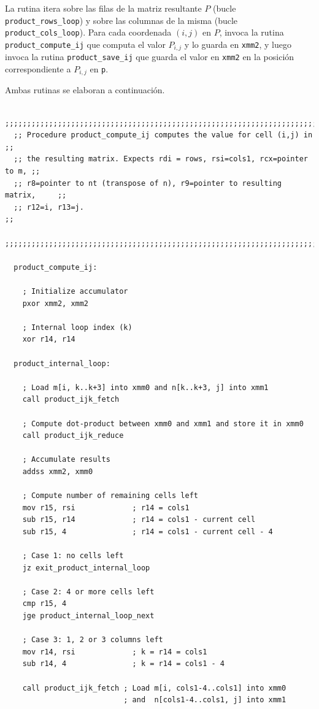 \documentclass[a4paper, 10pt, twoside]{article}
\newcommand{\cc}[1]{\texttt{#1}}
\begin{document}
La rutina itera sobre las filas de la matriz resultante $P$ (bucle
\cc{product\_rows\_loop}) y sobre las columnas de la misma (bucle
\cc{product\_cols\_loop}). Para cada coordenada $(i,j)$ en $P$, invoca la
rutina \cc{product\_compute\_ij} que computa el valor $P_{i,j}$ y lo guarda en
\cc{xmm2}, y luego invoca la rutina \cc{product\_save\_ij} que guarda el valor
en \cc{xmm2} en la posición correspondiente a $P_{i,j}$ en \cc{p}.

Ambas rutinas se elaboran a continuación.

\begin{verbatim}
  ;;;;;;;;;;;;;;;;;;;;;;;;;;;;;;;;;;;;;;;;;;;;;;;;;;;;;;;;;;;;;;;;;;;;;;;;;;;;
  ;; Procedure product_compute_ij computes the value for cell (i,j) in      ;;
  ;; the resulting matrix. Expects rdi = rows, rsi=cols1, rcx=pointer to m, ;;
  ;; r8=pointer to nt (transpose of n), r9=pointer to resulting matrix,     ;;
  ;; r12=i, r13=j.                                                          ;;
  ;;;;;;;;;;;;;;;;;;;;;;;;;;;;;;;;;;;;;;;;;;;;;;;;;;;;;;;;;;;;;;;;;;;;;;;;;;;;

  product_compute_ij:

    ; Initialize accumulator
    pxor xmm2, xmm2

    ; Internal loop index (k)
    xor r14, r14

  product_internal_loop:

    ; Load m[i, k..k+3] into xmm0 and n[k..k+3, j] into xmm1
    call product_ijk_fetch

    ; Compute dot-product between xmm0 and xmm1 and store it in xmm0
    call product_ijk_reduce

    ; Accumulate results
    addss xmm2, xmm0

    ; Compute number of remaining cells left
    mov r15, rsi             ; r14 = cols1
    sub r15, r14             ; r14 = cols1 - current cell
    sub r15, 4               ; r14 = cols1 - current cell - 4

    ; Case 1: no cells left
    jz exit_product_internal_loop

    ; Case 2: 4 or more cells left
    cmp r15, 4
    jge product_internal_loop_next

    ; Case 3: 1, 2 or 3 columns left
    mov r14, rsi             ; k = r14 = cols1
    sub r14, 4               ; k = r14 = cols1 - 4

    call product_ijk_fetch ; Load m[i, cols1-4..cols1] into xmm0
                           ; and  n[cols1-4..cols1, j] into xmm1


\end{verbatim}
\end{document}

